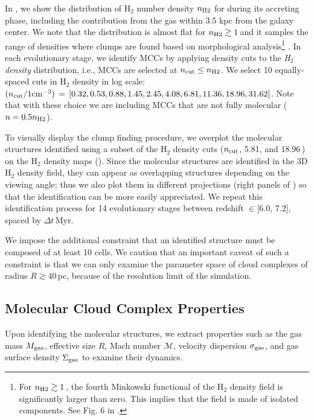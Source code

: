 \IfFileExists{emulateapjlegacy.cls}{\documentclass[iop]{emulateapjlegacy}}{\documentclass[iop]{emulateapj}}
\begin{document}
In , we show the distribution of H$_2$ number density $n_{\rm H2}$ for \flower during its accreting phase, including the contribution from the gas within 3.5 kpc from the galaxy center.
%
We note that the distribution is almost flat for $n_{\rm H2}\gtrsim1$\,\cc and it samples the range of densities where clumps are found based on morphological analysis\footnote{For $n_{\rm H2}\gtrsim1$\,\cc, the fourth Minkowski functional of the H$_{2}$ density field is significantly larger than zero. This implies that the field is made of isolated components. See Fig. 6 in \citet{Pallottini17b}.} \citep{Pallottini17b}.
%
In each evolutionary stage, we identify MCCs by applying density cuts to the {\em H$_2$ density} distribution, i.e., MCCs
are selected at $n_{\rm cut} \leq n_{\rm H2}$. We select 10 equally-spaced cuts in H$_2$ density in log scale: ${(n_{\rm cut}/{1 {\rm cm}^{-3})}}\,=\,[0.32, 0.53, 0.88, 1.45, 2.45, 4.08, 6.81, 11.36, 18.96, 31.62]$.
Note that with these choice we are including MCCs that are not fully molecular ($n = 0.5 n_{\rm H2}$).

To visually display the clump finding procedure, we overplot the molecular structures identified using a subset of the H$_2$ density cuts ($n_{\rm cut}$, 5.81, and 18.96\,\cc) on the H$_2$ density maps (). Since the molecular structures are identified in the 3D H$_2$ density field, they can appear as overlapping structures depending on the viewing angle; thus we also plot them in different projections (right panels of ) so that the identification can be more easily appreciated.
%
We repeat this identification process for 14 evolutionary stages between redshift \z$\in$[6.0, 7.2], spaced by $\Delta t$\,Myr.

We impose the additional constraint that an identified structure must be composed of at least 10 cells. We caution that an important caveat of such a constraint is that we can only examine the parameter space of cloud complexes of radius $R\gtrsim 40$\,pc, because of the resolution limit of the simulation.

\subsection{Molecular Cloud Complex Properties} \label{sec:distribution}

Upon identifying the molecular structures, we extract properties such as the gas mass $M_{\rm gas}$, effective size $R$, Mach number
$\mathcal{M}$, velocity dispersion $\sigma_{\rm gas}$, and gas surface density $\Sigma_{\rm gas}$ to examine their dynamics.
\end{document}
